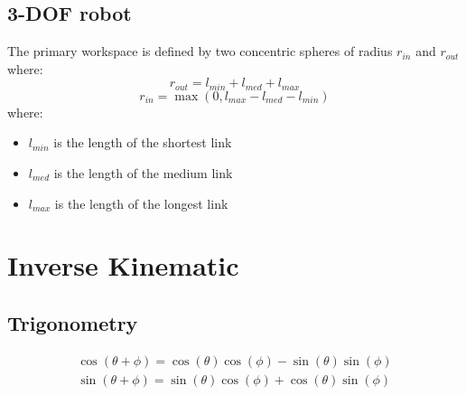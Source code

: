 \documentclass[11pt]{article}
\begin{document}
\subsection{3-DOF robot}
The primary workspace is defined by two concentric spheres of radius $r_{in}$ and $r_{out}$ where:
\begin{equation}
r_{out}= l_{min}+l_{med}+l_{max}
\end{equation}
\begin{equation}
r_{in} = \max(0,l_{max}- l_{med} -l_{min})
\end{equation}
where:
\begin{itemize}
\item $l_{min}$ is the length of the shortest link
\item $l_{med}$ is the length of the medium link
\item $l_{max}$ is the length of the longest link
\end{itemize}
\section{Inverse Kinematic}
\subsection{Trigonometry}
\begin{align}
    \cos(\theta+\phi) = \cos(\theta)\cos(\phi)-\sin(\theta)\sin(\phi) \\
    \sin(\theta+\phi) = \sin(\theta)\cos(\phi)+\cos(\theta)\sin(\phi)
\end{align}
\end{document}
